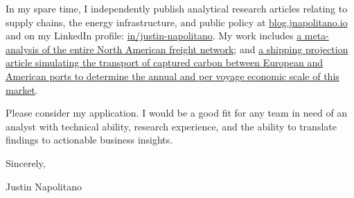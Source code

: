 \documentclass{ExpressiveCoverLetter}
\begin{document}
\begin{flushleft}
\begin{normalsize}
    In my spare time, I independently publish analytical research articles relating to supply chains, the energy infrastructure, and public policy at \href{https://blog.jnapolitano.io}{blog.jnapolitano.io} and on my LinkedIn profile: \href{https://www.linkedin.com/in/justin-napolitano/}{in/justin-napolitano}. My work includes \href{https://freight.jnapolitano.io}{a meta-analysis of the entire North American freight network}; and \href{https://blog.jnapolitano.io/carbon-shipping-projections/}{a shipping projection article simulating the transport of captured carbon between European and American ports to determine the annual and per voyage economic scale of this market}. 

    Please consider my application.  I would be a good fit for any team in need of an analyst with technical ability, research experience, and the ability to translate findings to actionable business insights. 

    \vspace{.15in}

    Sincerely,

    \vspace{.15in}

    Justin Napolitano

\end{normalsize}
\end{flushleft}
\end{document}
